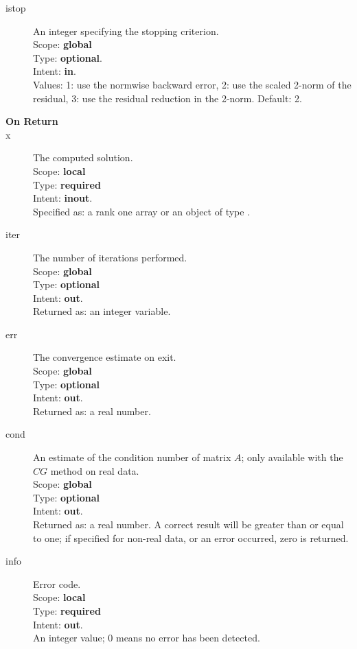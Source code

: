 \begin{description}
\item[istop]  An integer specifying the stopping criterion.\\
Scope: {\bf global} \\
Type: {\bf optional}.\\
Intent: {\bf in}.\\
Values: 1: use the normwise backward error, 2: use the scaled 2-norm
of the residual, 3: use the residual reduction in the 2-norm. Default: 2. 
\item[\bf On Return] 
\item[x] The computed solution. \\
Scope: {\bf local} \\
Type: {\bf required}\\
Intent: {\bf inout}.\\
Specified as:  a rank one array or an object of type \vdata.
\item[iter]  The number of iterations performed.\\
Scope: {\bf global} \\
Type: {\bf optional}\\
Intent: {\bf out}.\\
Returned  as: an integer variable.
\item[err]  The convergence estimate on exit.\\
Scope: {\bf global} \\
Type: {\bf optional}\\
Intent: {\bf out}.\\
Returned  as: a real number.
\item[cond]  An estimate of the condition number of matrix $A$; only
  available with the $CG$ method on real data.\\
Scope: {\bf global} \\
Type: {\bf optional}\\
Intent: {\bf out}.\\
Returned  as: a real number. A correct result will be greater than or
equal to one; if specified for non-real data, or an error occurred,
zero is returned.
\item[info] Error code.\\
Scope: {\bf local} \\
Type: {\bf required} \\
Intent: {\bf out}.\\
An integer value; 0 means no error has been detected. 
\end{description}


